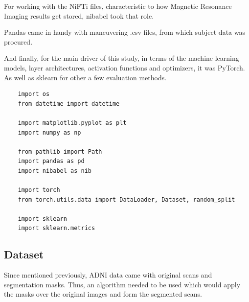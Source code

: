 \documentclass[a4paper, 12pt]{article}
\begin{document}
For working with the NiFTi files, characteristic to how Magnetic Resonance Imaging results get stored, nibabel took that role.

Pandas came in handy with maneuvering .csv files, from which subject data was procured.

And finally, for the main driver of this study, in terms of the machine learning models, layer architectures, activation functions and optimizers,
it was PyTorch. As well as sklearn for other a few evaluation methods.

\begin{lstlisting}
    import os
    from datetime import datetime
    
    import matplotlib.pyplot as plt
    import numpy as np
    
    from pathlib import Path
    import pandas as pd
    import nibabel as nib
    
    import torch
    from torch.utils.data import DataLoader, Dataset, random_split
    
    import sklearn
    import sklearn.metrics
\end{lstlisting}

\newpage
\subsection{Dataset}
Since mentioned previously, ADNI data came with original scans and segmentation masks. Thus, an algorithm needed to be used which would
apply the masks over the original images and form the segmented scans.
\end{document}

